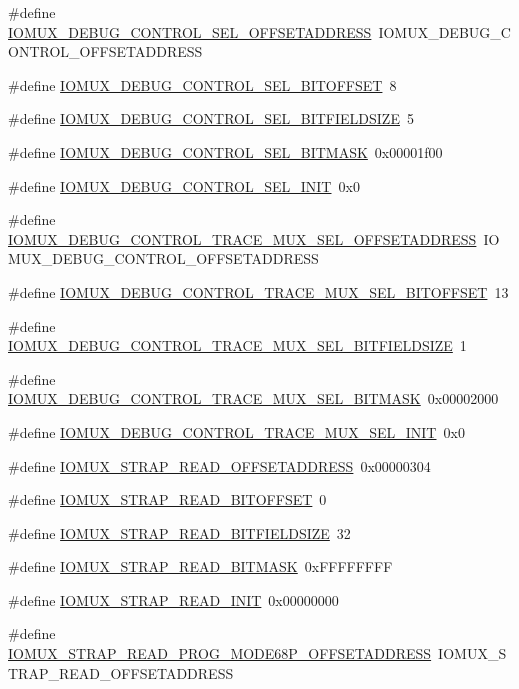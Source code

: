 \begin{DoxyCompactItemize}
\#define \hyperlink{a00560_ac06645a5dc56f3b874ac6a2bd12634e9}{IOMUX\_\-DEBUG\_\-CONTROL\_\-SEL\_\-OFFSETADDRESS}~IOMUX\_\-DEBUG\_\-CONTROL\_\-OFFSETADDRESS
\item 
\#define \hyperlink{a00560_a72ad3578f8f23500dc06361d2a083244}{IOMUX\_\-DEBUG\_\-CONTROL\_\-SEL\_\-BITOFFSET}~8
\item 
\#define \hyperlink{a00560_a9b661af4a869144d1f7f50fcb72cec5b}{IOMUX\_\-DEBUG\_\-CONTROL\_\-SEL\_\-BITFIELDSIZE}~5
\item 
\#define \hyperlink{a00560_a1e74c64c5bd10352c54475ef400dc706}{IOMUX\_\-DEBUG\_\-CONTROL\_\-SEL\_\-BITMASK}~0x00001f00
\item 
\#define \hyperlink{a00560_aaa4fc3d7c528513b90bfaf558324df05}{IOMUX\_\-DEBUG\_\-CONTROL\_\-SEL\_\-INIT}~0x0
\item 
\#define \hyperlink{a00560_ac2d6550fa7d203db7478ace097ba33cc}{IOMUX\_\-DEBUG\_\-CONTROL\_\-TRACE\_\-MUX\_\-SEL\_\-OFFSETADDRESS}~IOMUX\_\-DEBUG\_\-CONTROL\_\-OFFSETADDRESS
\item 
\#define \hyperlink{a00560_a33ec8a5476282e00816b29cef09bd7ac}{IOMUX\_\-DEBUG\_\-CONTROL\_\-TRACE\_\-MUX\_\-SEL\_\-BITOFFSET}~13
\item 
\#define \hyperlink{a00560_ac157b9d871d2fcf61f1f56243ee07749}{IOMUX\_\-DEBUG\_\-CONTROL\_\-TRACE\_\-MUX\_\-SEL\_\-BITFIELDSIZE}~1
\item 
\#define \hyperlink{a00560_a31a560b12663f2fb93fe9b2a1721b067}{IOMUX\_\-DEBUG\_\-CONTROL\_\-TRACE\_\-MUX\_\-SEL\_\-BITMASK}~0x00002000
\item 
\#define \hyperlink{a00560_a6bc5c750fe6fff974d29c68a53de2643}{IOMUX\_\-DEBUG\_\-CONTROL\_\-TRACE\_\-MUX\_\-SEL\_\-INIT}~0x0
\item 
\#define \hyperlink{a00560_a94c89aaff924245ed4a1ebc717563621}{IOMUX\_\-STRAP\_\-READ\_\-OFFSETADDRESS}~0x00000304
\item 
\#define \hyperlink{a00560_acf25fab1cd2d1ac9e9d1ea7e6e74c63c}{IOMUX\_\-STRAP\_\-READ\_\-BITOFFSET}~0
\item 
\#define \hyperlink{a00560_ae3bc0593999455191f3be2d561d17ead}{IOMUX\_\-STRAP\_\-READ\_\-BITFIELDSIZE}~32
\item 
\#define \hyperlink{a00560_a563e1a960d3790e43fbdf473abcd9142}{IOMUX\_\-STRAP\_\-READ\_\-BITMASK}~0xFFFFFFFF
\item 
\#define \hyperlink{a00560_a84441260ad5fc736fefe0ff3ea6de2b2}{IOMUX\_\-STRAP\_\-READ\_\-INIT}~0x00000000
\item 
\#define \hyperlink{a00560_a297dbafe4b0d535b8b0ab919f6c2c04e}{IOMUX\_\-STRAP\_\-READ\_\-PROG\_\-MODE68P\_\-OFFSETADDRESS}~IOMUX\_\-STRAP\_\-READ\_\-OFFSETADDRESS

\end{DoxyCompactItemize}
